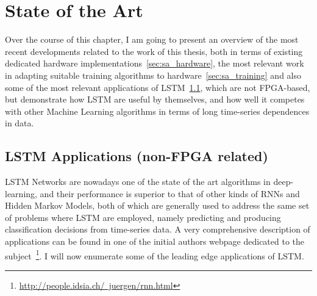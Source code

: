\chapter{State of the Art}\label{chap:stateArt}

Over the course of this chapter, I am going to present an overview of the most recent developments related to the work of this thesis, both in terms of existing dedicated hardware implementations~\ref{sec:sa_hardware}, the most relevant work in adapting suitable training algorithms to hardware~\ref{sec:sa_training} and also some of the most relevant applications of LSTM~\ref{sec:sa_apps}, which are not FPGA-based, but demonstrate how LSTM are useful by themselves, and how well it competes with other Machine Learning algorithms in terms of long time-series dependences in data.

\section{LSTM Applications (non-FPGA related)}\label{sec:sa_apps}
LSTM Networks are nowadays one of the state of the art algorithms in deep-learning, and their performance is superior to that of other kinds of RNNs and Hidden Markov Models, both of which are generally used to address the same set of problems where LSTM are employed, namely predicting and producing classification decisions from time-series data. A very comprehensive description of applications can be found in one of the initial authors webpage dedicated to the subject~\footnote{\href{http://people.idsia.ch/~juergen/rnn.html}{http://people.idsia.ch/~juergen/rnn.html}}. I will now enumerate some of the leading edge applications of LSTM.

